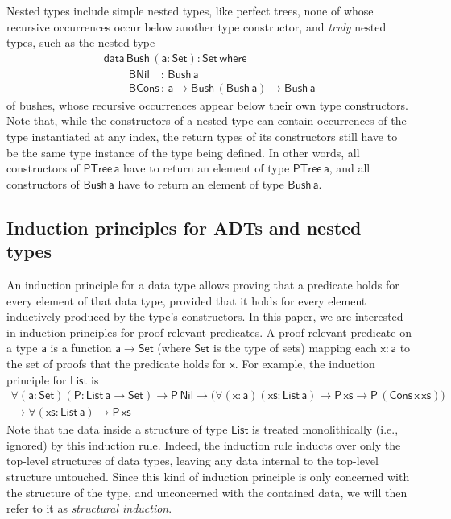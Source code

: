\documentclass[acmsmall,screen,review,anonymous]{acmart}
\theoremstyle{definition}
\begin{document}
Nested types include simple nested types, like perfect trees,
none of whose recursive occurrences occur below another type constructor,
and \emph{truly} nested types, such as the nested type
\begin{equation}\label{eq:ptree}
\begin{array}{l}
\mathsf{data\, Bush\,(a : Set) : Set\,where}\\
\mathsf{\;\;\;\;\;\;\;\;BNil\,\,\,\,\,\, :\, Bush\,a}\\
\mathsf{\;\;\;\;\;\;\;\;BCons\, :\, a \to Bush\,(Bush\,a) \to Bush\,a} 
\end{array}
\end{equation}
of bushes, whose recursive occurrences appear below their own type constructors.
Note that, while the constructors of a nested type can contain occurrences of the type instantiated at any index,
the return types of its constructors still have to be the same type instance of the type being defined.
In other words, all constructors of $\mathsf{PTree\,a}$ have to return an element of type $\mathsf{PTree\,a}$,
and all constructors of $\mathsf{Bush\,a}$ have to return an element of type $\mathsf{Bush\,a}$.


\subsection{Induction principles for ADTs and nested types}\label{ssec:induction-nested}

An induction principle for a data type allows proving
that a predicate holds for every element of that data type,
provided that it holds for every element inductively produced by the type's constructors.
In this paper, we are interested in induction principles for proof-relevant predicates.
A proof-relevant predicate on a type $\mathsf{a}$ is a function $\mathsf{a \to Set}$
(where $\mathsf{Set}$ is the type of sets)
mapping each $\mathsf{x : a}$ to the set of proofs that the predicate holds for $\mathsf{x}$.
For example, the induction principle for $\mathsf{List}$ is
\begin{multline}
\mathsf{\forall (a : Set) (P : List\,a \to Set) \to P\,Nil \to \big( \forall (x : a) (xs: List\,a) \to P\,xs \to P\,(Cons\,x\,xs)\big)} \\
\mathsf{\to \forall (xs : List\,a) \to P\, xs }
\end{multline}
Note that the data inside a structure of type $\mathsf{List}$ is treated monolithically (i.e., ignored) by this induction rule.
Indeed, the induction rule inducts over only the top-level structures of data types,
leaving any data internal to the top-level structure untouched.
Since this kind of induction principle is only concerned with the structure of the type,
and unconcerned with the contained data,
we will then refer to it as \emph{structural induction}.
\end{document}
